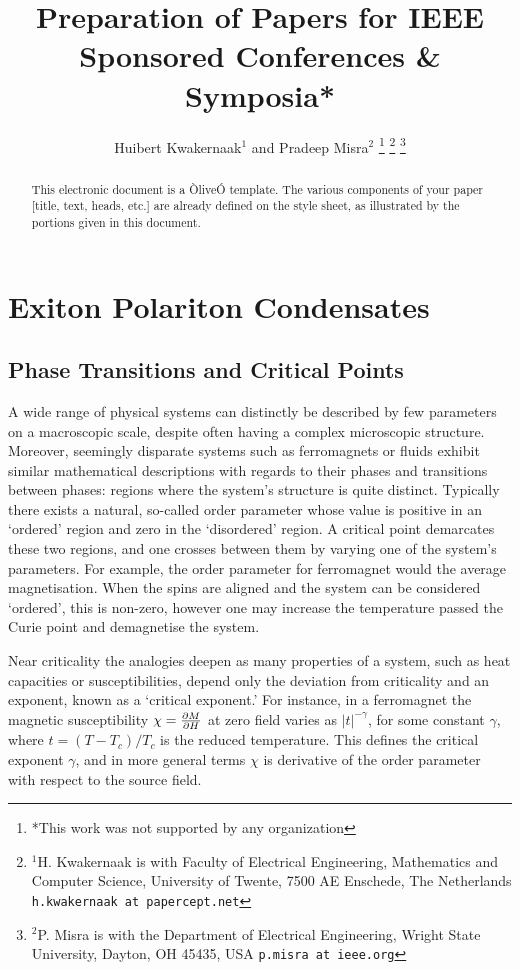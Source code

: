 \documentclass[letterpaper, 10 pt, conference]{IEEEtran}  %
\title{\LARGE \bf
Preparation of Papers for IEEE Sponsored Conferences \& Symposia*
}
\author{Huibert Kwakernaak$^{1}$ and Pradeep Misra$^{2}$%
\thanks{*This work was not supported by any organization}%
\thanks{$^{1}$H. Kwakernaak is with Faculty of Electrical Engineering, Mathematics and Computer Science,
        University of Twente, 7500 AE Enschede, The Netherlands
        {\tt\small h.kwakernaak at papercept.net}}%
\thanks{$^{2}$P. Misra is with the Department of Electrical Engineering, Wright State University,
        Dayton, OH 45435, USA
        {\tt\small p.misra at ieee.org}}%
}
\begin{document}
\maketitle
\thispagestyle{empty}
\pagestyle{empty}


\begin{abstract}

This electronic document is a ÒliveÓ template. The various components of your paper [title, text, heads, etc.] are already defined on the style sheet, as illustrated by the portions given in this document.

\end{abstract}


\section{Exiton Polariton Condensates}

\subsection{Phase Transitions and Critical Points}

A wide range of physical systems can distinctly be described by few parameters on a macroscopic scale, despite often having a complex microscopic structure. 
Moreover, seemingly disparate systems such as ferromagnets or fluids exhibit similar mathematical descriptions with regards to their phases and transitions between phases: regions where the system's structure is quite distinct. 
Typically there exists a natural, so-called order parameter whose value is positive in an `ordered' region and zero in the `disordered' region.
A critical point demarcates these two regions, and one crosses between them by varying one of the system's parameters. 
For example, the order parameter for ferromagnet would the average magnetisation. When the spins are aligned and the system can be considered `ordered', this is non-zero, however one may increase the temperature passed the Curie point and demagnetise the system.  

Near criticality the analogies deepen as many properties of a system, such as heat capacities or susceptibilities, depend only the deviation from criticality and an exponent, known as a `critical exponent.' 
For instance, in a ferromagnet the magnetic susceptibility $\chi= \pdv{M}{H}$ at zero field varies as $|t|^{-\gamma}$, for some constant $\gamma$, where $t = (T-T_c)/T_c$ is the reduced temperature. 
This defines the critical exponent $\gamma$, and in more general terms $\chi$ is derivative of the order parameter with respect to the source field. 
\end{document}
